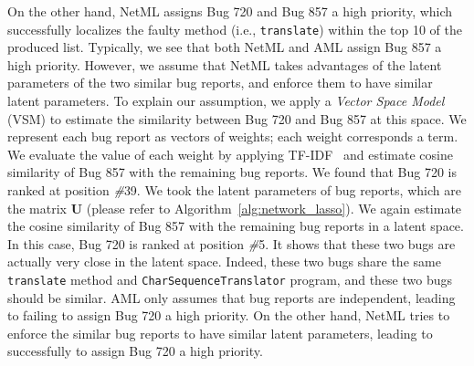 On the other hand, NetML assigns Bug 720 and Bug 857 a high priority, which successfully localizes the faulty method (i.e., \texttt{translate}) within the top 10 of the produced list. Typically, we see that both NetML and AML assign Bug 857 a high priority. However, we assume that NetML takes advantages of the latent parameters of the two similar bug reports, and enforce them to have similar latent parameters. To explain our assumption, we apply a \textit{Vector Space Model} (VSM) to estimate the similarity between Bug 720 and Bug 857 at this space. We represent each bug report as vectors of weights; each weight corresponds a term. We evaluate the value of each weight by applying TF-IDF~\cite{Ramos1999} and estimate cosine similarity of Bug 857 with the remaining bug reports. We found that Bug 720 is ranked at position \textit{\#}39. We took the latent parameters of bug reports, which are the matrix $\mathbf{U}$ (please refer to Algorithm~\ref{alg:network_lasso}). We again estimate the cosine similarity of Bug 857 with the remaining bug reports in a latent space. In this case, Bug 720 is ranked at position \textit{\#}5. It shows that these two bugs are actually very close in the latent space. Indeed, these two bugs share the same \texttt{translate} method and  \texttt{CharSequenceTranslator} program, and these two bugs should be similar. AML only assumes that bug reports are independent, leading to failing to assign Bug 720 a high priority. On the other hand, NetML tries to enforce the similar bug reports to have similar latent parameters, leading to successfully to assign Bug 720 a high priority. 

